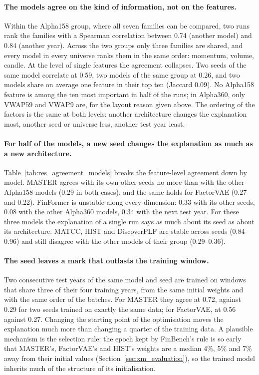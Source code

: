 

\paragraph{The models agree on the kind of information, not on the features.} Within the Alpha158 group, where all seven families can be compared, two runs rank the families with a Spearman correlation between 0.74 (another model) and 0.84 (another year). Across the two groups only three families are shared, and every model in every universe ranks them in the same order: momentum, volume, candle. At the level of single features the agreement collapses. Two seeds of the same model correlate at 0.59, two models of the same group at 0.26, and two models share on average one feature in their top ten (Jaccard 0.09). No Alpha158 feature is among the ten most important in half of the runs; in Alpha360, only VWAP59 and VWAP9 are, for the layout reason given above. The ordering of the factors is the same at both levels: another architecture changes the explanation most, another seed or universe less, another test year least.

\paragraph{For half of the models, a new seed changes the explanation as much as a new architecture.} Table~\ref{tab:res_agreement_models} breaks the feature-level agreement down by model. MASTER agrees with its own other seeds no more than with the other Alpha158 models (0.29 in both cases), and the same holds for FactorVAE (0.27 and 0.22). FinFormer is unstable along every dimension: 0.33 with its other seeds, 0.08 with the other Alpha360 models, 0.34 with the next test year. For these three models the explanation of a single run says as much about its seed as about its architecture. MATCC, HIST and DiscoverPLF are stable across seeds (0.84--0.96) and still disagree with the other models of their group (0.29--0.36).



\paragraph{The seed leaves a mark that outlasts the training window.} Two consecutive test years of the same model and seed are trained on windows that share three of their four training years, from the same initial weights and with the same order of the batches. For MASTER they agree at 0.72, against 0.29 for two seeds trained on exactly the same data; for FactorVAE, at 0.56 against 0.27. Changing the starting point of the optimisation moves the explanation much more than changing a quarter of the training data. A plausible mechanism is the selection rule: the epoch kept by FinBench's rule is so early that MASTER's, FactorVAE's and HIST's weights are a median 4\%, 5\% and 7\% away from their initial values (Section~\ref{sec:xm_evaluation}), so the trained model inherits much of the structure of its initialisation.


